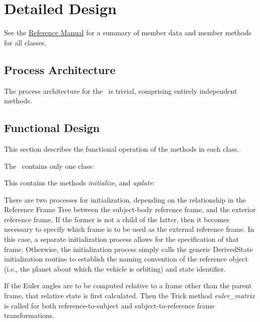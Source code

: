 
%
%
% 
%

\section{Detailed Design}

See the \href{file:refman.pdf}{Reference Manual}\cite{derivedstatebib:ReferenceManual} for a summary of member data and member methods for all classes.  

\subsection{Process Architecture}
The process architecture for the \EulerDesc\ is trivial, comprising entirely independent methods.

\subsection{Functional Design}
This section describes the functional operation of the methods in each class.

The \EulerDesc\ contains only one class:
\begin{itemize}

This contains the methods \textit{initialize}, and \textit{update}:
\begin{enumerate}

There are two processes for initialization, depending on the relationship in the Reference Frame Tree between the subject-body reference frame, and the exterior reference frame.  If the former is not a child of the latter, then it becomes necessary to specify which frame is to be used as the external reference frame.  In this case, a separate initialization process allows for the specification of that frame.  Otherwise, the initialization process simply calls the generic DerivedState initialization routine to establish the naming convention of the reference object (i.e., the planet about which the vehicle is orbiting) and state identifier.

If the Euler angles are to be computed relative to a frame other than the parent frame, that relative state is first calculated.  Then the Trick method \textit{euler\_matrix} is called for both reference-to-subject and subject-to-reference frame transformations.

\end{enumerate}
\end{itemize}
